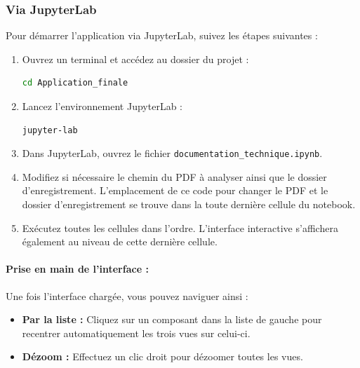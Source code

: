 \documentclass[a4paper,11pt]{article}
\begin{document}
\subsubsection{Via JupyterLab}
Pour démarrer l'application via JupyterLab, suivez les étapes suivantes :
\begin{enumerate}
    \item Ouvrez un terminal et accédez au dossier du projet :
    \begin{lstlisting}[language=bash]
cd Application_finale
    \end{lstlisting}
    \item Lancez l'environnement JupyterLab :
    \begin{lstlisting}[language=bash]
jupyter-lab
    \end{lstlisting}
    \item Dans JupyterLab, ouvrez le fichier \texttt{documentation\_technique.ipynb}.
    \item Modifiez si nécessaire le chemin du PDF à analyser ainsi que le dossier d'enregistrement. L'emplacement de ce code pour changer le PDF et le dossier d'enregistrement se trouve dans la toute dernière cellule du notebook.
    \item Exécutez toutes les cellules dans l'ordre. L'interface interactive s'affichera également au niveau de cette dernière cellule.
\end{enumerate}
\paragraph{Prise en main de l'interface :}
Une fois l'interface chargée, vous pouvez naviguer ainsi :
\begin{itemize}
    \item \textbf{Par la liste :} Cliquez sur un composant dans la liste de gauche pour recentrer automatiquement les trois vues sur celui-ci.
    \item \textbf{Dézoom :} Effectuez un clic droit pour dézoomer toutes les vues.
\end{itemize}
\end{document}
